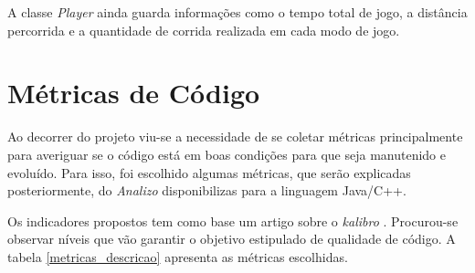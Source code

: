 A classe \textit{Player} ainda guarda informações como o tempo total de jogo, a distância percorrida e a quantidade de corrida realizada em cada modo de jogo.

\section{Métricas de Código}

Ao decorrer do projeto viu-se a necessidade de se coletar métricas principalmente para averiguar se o código está em boas condições para que seja manutenido e evoluído. Para isso, foi escolhido algumas métricas, que serão explicadas posteriormente, do \textit{Analizo} disponibilizas para a linguagem Java/C++.

Os indicadores propostos tem como base um artigo sobre o \textit{kalibro} \cite{dekalibro}. Procurou-se observar níveis que vão garantir o objetivo estipulado de qualidade de código. A tabela \ref{metricas_descricao} apresenta as métricas escolhidas.

